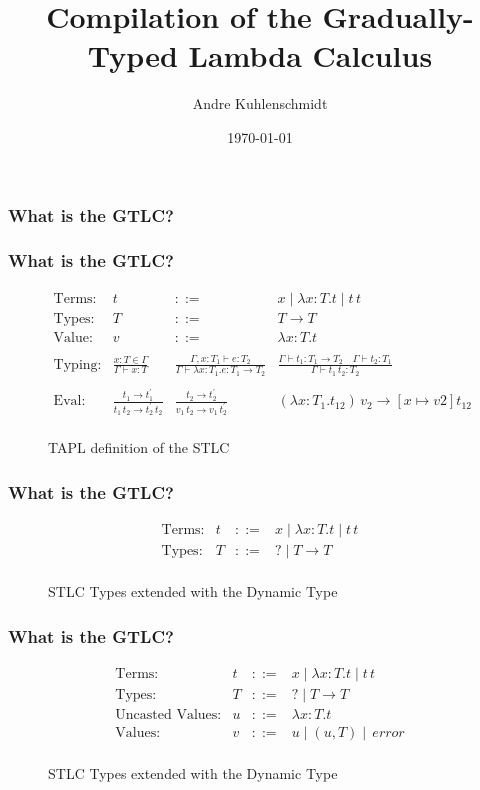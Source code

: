\documentclass{beamer}
\title{Compilation of the Gradually-Typed Lambda Calculus}
\author{Andre Kuhlenschmidt}
\date{\today}
\newcommand{\If}[3]{\mathit{if} \, #1 \, \mathit{then} \, #2 \, \mathit{else} \, #3}
\begin{document}
\frame{\titlepage}

\frame
{
  \frametitle{What is the GTLC?}
}

\frame
{
  	\frametitle{What is the GTLC?}
	\begin{figure}[h]
	\centering
	\[
	\begin{array}{lrcl}
		\text{Terms:} & t & ::= & x \mid \lambda x{:}T.t \mid t \, t \\
		\text{Types:} & T & ::= & T \rightarrow T \\
		\text{Value:} & v & ::= & \lambda x{:}T.t \\%
		\\
		\text{Typing:} & \frac{x:T \in \Gamma}{\Gamma \vdash x : T}
					   & \frac{\Gamma,x:T_1 \vdash e : T_2}
					         {\Gamma \vdash \lambda x:T_1.e : T_1 \to T_2} 
					   & \frac{\Gamma \vdash t_1 : T_1 \rightarrow T_2 \quad 
					           \Gamma \vdash t_2 : T_1}
					          {\Gamma \vdash t_1 \, t_2 : T_2}\\
		\\	
		\text{Eval:} & \frac{t_1 \rightarrow t_{1}^{\prime}}
					        {t_1 \, t_2 \rightarrow t_{2}^{\prime} \, t_2}
					 & \frac{t_2 \rightarrow t_{2}^{\prime}}
						    {v_1 \, t_2 \rightarrow v_1 \, t_{2}^{\prime}}
		             & \left( \lambda x {:} T_1 . t_12 \right) \, v_2 	  
		               \rightarrow \left[ x \mapsto v2 \right] t_12
		\\
	\end{array}
	\]
	\caption{TAPL definition of the STLC}
	\end{figure}
}

\frame
{
  	\frametitle{What is the GTLC?}
	\begin{figure}[h]
	\centering
	\[
	\begin{array}{lrcl}
		\text{Terms:} & t & ::= & x \mid \lambda x{:}T.t \mid t \, t \\
		\text{Types:} & T & ::= & ? \mid T \rightarrow T \\			 
	\end{array}
	\]
	\caption{STLC Types extended with the Dynamic Type}
	\end{figure}
}

\frame
{
  	\frametitle{What is the GTLC?}
	\begin{figure}[h]
	\centering
	\[
	\begin{array}{lrcl}
		\text{Terms:} & t & ::= & x \mid \lambda x{:}T.t \mid t \, t \\
		\text{Types:} & T & ::= & ? \mid T \rightarrow T \\			 
		\text{Uncasted Values:} & u & ::= & \lambda x{:}T.t \\
		\text{Values:} & v & ::= & u \mid \left(u, T \right) \mid \, error \\
	\end{array}
	\]
	\caption{STLC Types extended with the Dynamic Type}
	\end{figure}
}
\end{document}
